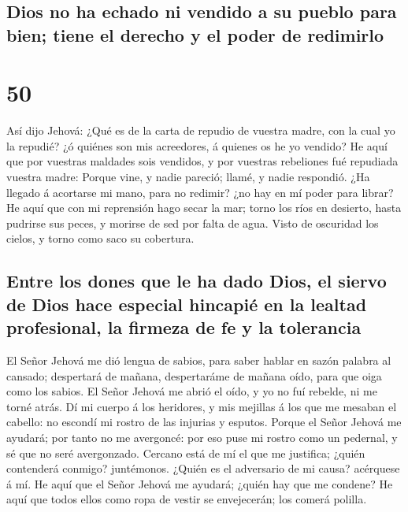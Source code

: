 \hypertarget{dios-no-ha-echado-ni-vendido-a-su-pueblo-para-bien-tiene-el-derecho-y-el-poder-de-redimirlo}{%
\subsection{Dios no ha echado ni vendido a su pueblo para bien; tiene el
derecho y el poder de
redimirlo}\label{dios-no-ha-echado-ni-vendido-a-su-pueblo-para-bien-tiene-el-derecho-y-el-poder-de-redimirlo}}

\hypertarget{section-49}{%
\section{50}\label{section-49}}

 Así dijo Jehová: ¿Qué es de la carta de repudio de
vuestra madre, con la cual yo la repudié? ¿ó quiénes son mis acreedores,
á quienes os he yo vendido? He aquí que por vuestras maldades sois
vendidos, y por vuestras rebeliones fué repudiada vuestra madre:
 Porque vine, y nadie pareció; llamé, y nadie respondió.
¿Ha llegado á acortarse mi mano, para no redimir? ¿no hay en mí poder
para librar? He aquí que con mi reprensión hago secar la mar; torno los
ríos en desierto, hasta pudrirse sus peces, y morirse de sed por falta
de agua.  Visto de oscuridad los cielos, y torno como saco
su cobertura.

\hypertarget{entre-los-dones-que-le-ha-dado-dios-el-siervo-de-dios-hace-especial-hincapiuxe9-en-la-lealtad-profesional-la-firmeza-de-fe-y-la-tolerancia}{%
\subsection{Entre los dones que le ha dado Dios, el siervo de Dios hace
especial hincapié en la lealtad profesional, la firmeza de fe y la
tolerancia}\label{entre-los-dones-que-le-ha-dado-dios-el-siervo-de-dios-hace-especial-hincapiuxe9-en-la-lealtad-profesional-la-firmeza-de-fe-y-la-tolerancia}}

 El Señor Jehová me dió lengua de sabios, para saber
hablar en sazón palabra al cansado; despertará de mañana, despertaráme
de mañana oído, para que oiga como los sabios.  El Señor
Jehová me abrió el oído, y yo no fuí rebelde, ni me torné atrás.
 Dí mi cuerpo á los heridores, y mis mejillas á los que me
mesaban el cabello: no escondí mi rostro de las injurias y esputos.
 Porque el Señor Jehová me ayudará; por tanto no me
avergoncé: por eso puse mi rostro como un pedernal, y sé que no seré
avergonzado.  Cercano está de mí el que me justifica;
¿quién contenderá conmigo? juntémonos. ¿Quién es el adversario de mi
causa? acérquese á mí.  He aquí que el Señor Jehová me
ayudará; ¿quién hay que me condene? He aquí que todos ellos como ropa de
vestir se envejecerán; los comerá polilla.

